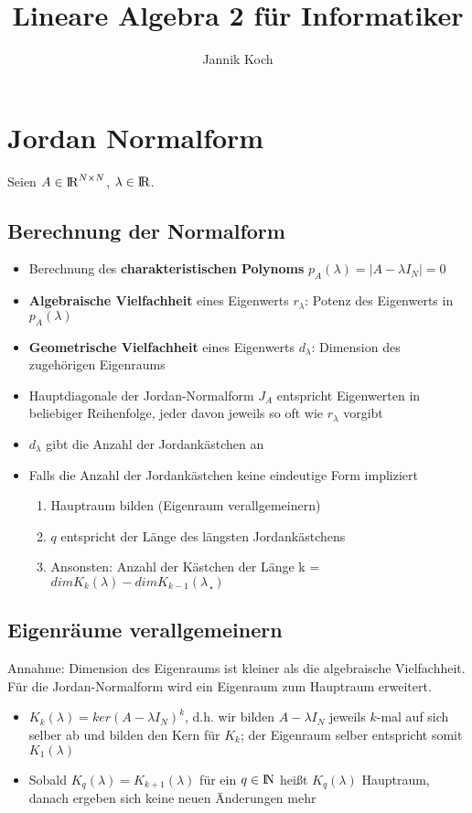 \documentclass[10pt,a4paper]{article}
\author{Jannik Koch}
\title{Lineare Algebra 2 für Informatiker}
\def\realnumbers{{\rm I\!R}}
\def\naturalnumbers{{\rm I\!N}}
\begin{document}
	{\let\newpage\relax\maketitle}
	\tableofcontents
	\newpage
	\setcounter{page}{1}

	\section{Jordan Normalform}
	Seien $A \in \realnumbers^{N\times N}$, $\lambda \in \realnumbers$.
	
	\subsection{Berechnung der Normalform}
	\begin{itemize}
		\item Berechnung des \textbf{charakteristischen Polynoms} $p_A(\lambda) = |A - \lambda I_N| = 0$
		\item \textbf{Algebraische Vielfachheit} eines Eigenwerts $r_\lambda$: Potenz des Eigenwerts in $p_A(\lambda)$
		\item \textbf{Geometrische Vielfachheit} eines Eigenwerts $d_\lambda$: Dimension des zugehörigen Eigenraums
		\item Hauptdiagonale der Jordan-Normalform $J_A$ entspricht Eigenwerten in beliebiger Reihenfolge, jeder davon jeweils so oft wie $r_\lambda$ vorgibt
		\item $d_\lambda$ gibt die Anzahl der Jordankästchen an
		\item Falls die Anzahl der Jordankästchen keine eindeutige Form impliziert
			\begin{enumerate}
				\item Hauptraum bilden (Eigenraum verallgemeinern)
				\item $q$ entspricht der Länge des längsten Jordankästchens
				\item Ansonsten: Anzahl der Kästchen der Länge k = $dim K_k(\lambda) - dim K_{k - 1}(\lambda¸)$
			\end{enumerate}
	\end{itemize}
	
	\subsection{Eigenräume verallgemeinern}
	Annahme: Dimension des Eigenraums ist kleiner als die algebraische Vielfachheit. Für die Jordan-Normalform wird ein Eigenraum zum Hauptraum erweitert.
	\begin{itemize}
		\item $K_k(\lambda) = ker(A - \lambda I_N)^k$, d.h. wir bilden $A - \lambda I_N$ jeweils $k$-mal auf sich selber ab und bilden den Kern für $K_k$; der Eigenraum selber entspricht somit $K_1(\lambda)$
		\item Sobald $K_q(\lambda) = K_{k + 1}(\lambda)$ für ein $q \in \naturalnumbers$ heißt $K_q(\lambda)$ Hauptraum, danach ergeben sich keine neuen Änderungen mehr
	\end{itemize}
	
\end{document}
